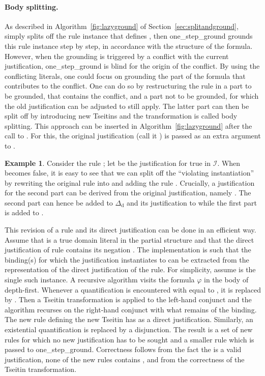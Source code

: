 \documentclass[11pt]{article}
\newcommand{\m}[1]{\ensuremath{#1}\xspace}
\newcommand{\I}{\m{\mathcal{I}}}
\newcommand{\D}{\m{\Delta}}
\newcommand{\f}{\m{\varphi}}
\theoremstyle{plain}
\theoremstyle{definition}
\theoremstyle{example_basic}
\newtheorem{example}[thm]{Example}
\theoremstyle{example_contd}
\theoremstyle{plain}
\newcommand{\groundone}{\textsf{one\_step\_ground}\xspace}
\newcommand{\Dd}{\ensuremath{\D_\text{d}}\xspace}
\newcommand{\change}[1]{#1}
\begin{document}
\paragraph{Body splitting.}
\change{As described in Algorithm~\ref{fig:lazyground} of
  Section~\ref{sec:splitandground}, \csplit simply splits off the rule
  instance that defines , then \groundone grounds this rule
  instance step by step, in accordance with the structure of the
  formula. However, when the grounding is triggered by a conflict with
  the current justification, \groundone is blind for the origin of the
  conflict. By using the conflicting literals, one could focus on
  grounding the part of the formula that contributes to the
  conflict. One can do so by restructuring the rule in a part to be
  grounded, that contains the conflict, and a part not to be grounded,
  for which the old justification can be adjusted to still apply. The latter part can then
  be split off by introducing new Tseitins and the transformation
  is called body splitting. This approach can be inserted in
  Algorithm~\ref{fig:lazyground} after the call to \csplit. For this, the original justification (call it ) is passed as an extra argument to \splitandground.}

\begin{example}
Consider the rule ; let  be the justification  for  true in \I.
When 
becomes \change{false}, it is easy to see that we can split off the ``violating
instantiation'' by rewriting the original rule into 
and adding the rule . Crucially, a
justification for the  \change{second part}
can be derived from the original justification,
namely  . 
The  \change{second part} can hence be added to \Dd and its justification to
\jgraph while the \change{first part is added to }.
\end{example}

\change{This revision of a rule  and its direct justification  can be
  done in an efficient way.  Assume that  is a true domain literal
  in the partial structure and that the direct justification of rule
   contains its negation . The implementation is such
  that the binding(s) for which the
  justification instantiates to  can be extracted from the
  representation of the direct justification of the rule. For
  simplicity, assume  is the
  single such instance. A recursive algorithm visits the formula \f in
  the body of  depth-first. Whenever a quantification  is encountered with  equal to , it
  is replaced by . Then
  a Tseitin transformation is applied to the left-hand conjunct and
  the algorithm recurses on the right-hand conjunct with what remains
  of the binding. The new rule defining the new Tseitin has
   as a direct justification. Similarly, an existential
  quantification is replaced by a disjunction.  }
The result is a set of new rules for which no new justification has to
be sought and a smaller rule  which is passed to
\groundone. Correctness follows from the fact the  is a
valid justification, none of the new rules contains , and from the
correctness of the Tseitin transformation. 
\end{document}
